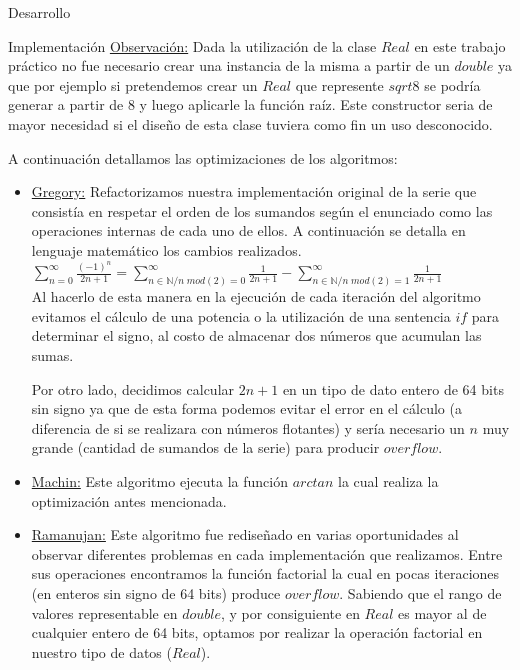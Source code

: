 \begin{section}{Desarrollo}
\begin{subsection}{Implementación}
		\underline{Observación:} Dada la utilización de la clase $Real$ en este trabajo práctico no fue necesario crear una instancia de la misma a partir de un $double$ ya que por ejemplo si pretendemos crear un $Real$ que represente $sqrt{8}$ se podría generar a partir de $8$ y luego aplicarle la función raíz. Este constructor seria de mayor necesidad si el diseño de esta clase tuviera como fin un uso desconocido.
		   
	   A continuación detallamos las optimizaciones de los algoritmos:

		\begin{itemize}
			\item \underline{Gregory:} Refactorizamos nuestra implementación original de la serie que consistía en respetar el orden de los sumandos según el enunciado como las operaciones internas de cada uno de ellos. A continuación se detalla en lenguaje matemático los cambios realizados.\\
							
				$\sum_{n=0}^{\infty}\frac{(-1)^n}{2n+1} = \sum_{n \in \mathbb{N} / n\;mod(2)=0}^{\infty}\frac{1}{2n+1}-\sum_{n \in \mathbb{N} / n\;mod(2)=1}^{\infty}\frac{1}{2n+1}$\\
				
				Al hacerlo de esta manera en la ejecución de cada iteración del algoritmo evitamos el cálculo de una potencia o la utilización de una sentencia $if$ para determinar el signo, al costo de almacenar dos números que acumulan las sumas.
				
				Por otro lado, decidimos calcular $2n+1$ en un tipo de dato entero de 64 bits sin signo ya que de esta forma podemos evitar el error en el cálculo (a diferencia de si se realizara con números flotantes) y sería necesario un $n$ muy grande (cantidad de sumandos de la serie) para producir $overflow$.
				
			\item \underline{Machin:} Este algoritmo ejecuta la función $arctan$ la cual realiza la optimización antes mencionada.
			
			\item \underline{Ramanujan:} Este algoritmo fue rediseñado en varias oportunidades al observar diferentes problemas en cada implementación que realizamos. Entre sus operaciones encontramos la función factorial la cual en pocas iteraciones (en enteros sin signo de 64 bits) produce $overflow$. Sabiendo que el rango de valores representable en $double$, y por consiguiente en $Real$ es mayor al de cualquier entero de 64 bits, optamos por realizar la operación factorial en nuestro tipo de datos ($Real$).
			

\end{itemize}
\end{subsection}
\end{section}
